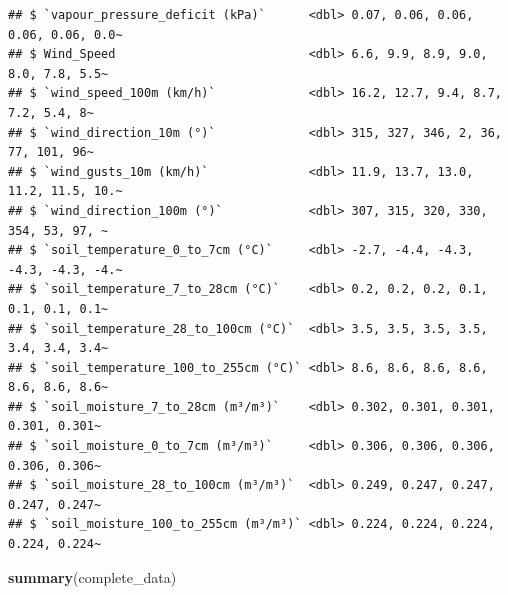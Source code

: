 \documentclass[
]{article}
\newenvironment{Shaded}{\begin{snugshade}}{\end{snugshade}}
\newcommand{\FunctionTok}[1]{\textcolor[rgb]{0.13,0.29,0.53}{\textbf{#1}}}
\newcommand{\NormalTok}[1]{#1}
\begin{document}
\begin{verbatim}
## $ `vapour_pressure_deficit (kPa)`      <dbl> 0.07, 0.06, 0.06, 0.06, 0.06, 0.0~
## $ Wind_Speed                           <dbl> 6.6, 9.9, 8.9, 9.0, 8.0, 7.8, 5.5~
## $ `wind_speed_100m (km/h)`             <dbl> 16.2, 12.7, 9.4, 8.7, 7.2, 5.4, 8~
## $ `wind_direction_10m (°)`             <dbl> 315, 327, 346, 2, 36, 77, 101, 96~
## $ `wind_gusts_10m (km/h)`              <dbl> 11.9, 13.7, 13.0, 11.2, 11.5, 10.~
## $ `wind_direction_100m (°)`            <dbl> 307, 315, 320, 330, 354, 53, 97, ~
## $ `soil_temperature_0_to_7cm (°C)`     <dbl> -2.7, -4.4, -4.3, -4.3, -4.3, -4.~
## $ `soil_temperature_7_to_28cm (°C)`    <dbl> 0.2, 0.2, 0.2, 0.1, 0.1, 0.1, 0.1~
## $ `soil_temperature_28_to_100cm (°C)`  <dbl> 3.5, 3.5, 3.5, 3.5, 3.4, 3.4, 3.4~
## $ `soil_temperature_100_to_255cm (°C)` <dbl> 8.6, 8.6, 8.6, 8.6, 8.6, 8.6, 8.6~
## $ `soil_moisture_7_to_28cm (m³/m³)`    <dbl> 0.302, 0.301, 0.301, 0.301, 0.301~
## $ `soil_moisture_0_to_7cm (m³/m³)`     <dbl> 0.306, 0.306, 0.306, 0.306, 0.306~
## $ `soil_moisture_28_to_100cm (m³/m³)`  <dbl> 0.249, 0.247, 0.247, 0.247, 0.247~
## $ `soil_moisture_100_to_255cm (m³/m³)` <dbl> 0.224, 0.224, 0.224, 0.224, 0.224~
\end{verbatim}

\begin{Shaded}
\begin{Highlighting}[]
\FunctionTok{summary}\NormalTok{(complete\_data)}
\end{Highlighting}
\end{Shaded}
\end{document}
